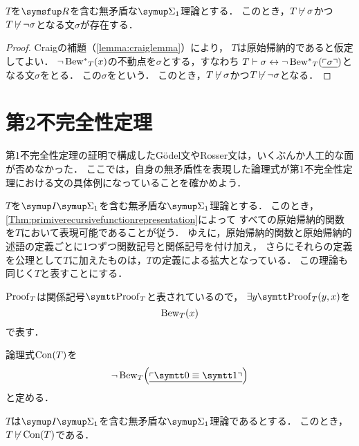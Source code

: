 \begin{Thm}[第1不完全性定理] \label{Thm:firstimcompletetheorem}
	\(T\)を\(\RArithmetic\)を含む無矛盾な\(\SigmaFormula_1\)理論とする．
	このとき，\(T \mathbin{\not\vdash} \sigma\)かつ\(T \mathbin{\not\vdash} \lnot \sigma\)となる文\(\sigma\)が存在する．
\end{Thm}

\begin{proof}
	Craigの補題（\cref{lemma:craiglemma}）により，
	\(T\)は原始帰納的であると仮定してよい．
	\(\lnot \apply{\Bewstar_T}{x}\)の不動点を\(\sigma\)とする，すなわち
	\(T \provable \sigma \formulaequiv \lnot \apply{\Bewstar_T}{\numeral{\GodelNumber{\sigma}}}\)となる文\(\sigma\)をとる．
	この\(\sigma\)をという．
	このとき，\(T \mathbin{\not\vdash} \sigma\)かつ\(T \mathbin{\not\vdash} \lnot \sigma\)となる．
\end{proof}


\section{第2不完全性定理} \label{sec:secondimcompletetheorem}

第1不完全性定理の証明で構成したGödel文やRosser文は，いくぶんか人工的な面が否めなかった．
ここでは，自身の無矛盾性を表現した論理式が第1不完全性定理における文の具体例になっていることを確かめよう．

\begin{Def} \label{Def:objbew}
	\(T\)を\(\SigmaFormulaInduction_1\)を含む無矛盾な\(\SigmaFormula_1\)理論とする．
	このとき，\cref{Thm:primiverecursivefunctionrepresentation}によって
	すべての原始帰納的関数を\(T\)において表現可能であることが従う．
	ゆえに，原始帰納的関数と原始帰納的述語の定義ごとに1つずつ関数記号と関係記号を付け加え，
	さらにそれらの定義を公理として\(T\)に加えたものは，\(T\)の定義による拡大となっている．
	この理論も同じく\(T\)と表すことにする．

	\(\operatorname{Proof}_T\)は関係記号\(\obj{\ProofPredicate}_T\)と表されているので，
	\(\exists y \apply{\obj{\ProofPredicate}_T}{y, x}\)を
	\begin{equation}
		\apply{\Bew_T}{x}
		\label{eq:objbewt}
	\end{equation}
	で表す．
\end{Def}

\begin{Def} \label{Def:consistencyformula}
	論理式\(\apply{\Con}{T}\)を
	\begin{equation}
		\lnot \apply{\Bew_T}{\numeral{\GodelNumber{\obj{0} \objeq \obj{1}}}}
		\label{eq:consistencyformula}
	\end{equation}
	と定める．
\end{Def}

\begin{Thm}[第2不完全性定理] \label{thm:secondimcompletetheorem}
	\(T\)は\(\SigmaFormulaInduction_1\)を含む無矛盾な\(\SigmaFormula_1\)理論であるとする．
	このとき，\(T \notprovable \apply{\Con}{T}\)である．
\end{Thm}